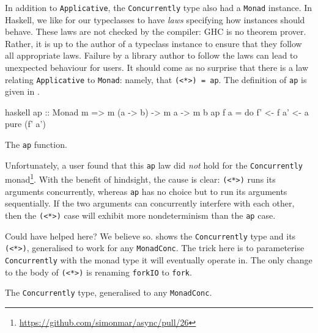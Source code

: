In addition to \verb|Applicative|, the \verb|Concurrently| type also
had a \verb|Monad| instance.  In Haskell, we like for our typeclasses
to have \emph{laws} specifying how instances should behave.  These
laws are not checked by the compiler: GHC is no theorem prover.
Rather, it is up to the author of a typeclass instance to ensure that
they follow all appropriate laws.  Failure by a library author to
follow the laws can lead to unexpected behaviour for users.  It should
come as no surprise that there is a law relating \verb|Applicative| to
\verb|Monad|: namely, that \verb|(<*>) = ap|.  The definition of
\verb|ap| is given in .

\begin{listing}
\centering
\begin{cminted}{haskell}
ap :: Monad m => m (a -> b) -> m a -> m b
ap f a = do
  f' <- f
  a' <- a
  pure (f' a')
\end{cminted}
\caption{The \texttt{ap} function.}\label{lst:ap}
\end{listing}

Unfortunately, a user found that this \verb|ap| law did \emph{not}
hold for the \verb|Concurrently|
monad\footnote{\url{https://github.com/simonmar/async/pull/26}}.  With
the benefit of hindsight, the cause is clear: \verb|(<*>)| runs its
arguments concurrently, whereas \verb|ap| has no choice but to run its
arguments sequentially.  If the two arguments can concurrently
interfere with each other, then the \verb|(<*>)| case will exhibit
more nondeterminism than the \verb|ap| case.

Could \dejafu{} have helped here?  We believe so.
 shows the \verb|Concurrently| type and its
\verb|(<*>)|, generalised to work for any \verb|MonadConc|.  The trick
here is to parameterise \verb|Concurrently| with the monad type it
will eventually operate in.  The only change to the body of
\verb|(<*>)| is renaming \verb|forkIO| to \verb|fork|.

\begin{listing}
\centering
{}
\caption{The \texttt{Concurrently} type, generalised to any \texttt{MonadConc}.}\label{lst:concurrently2}
\end{listing}

